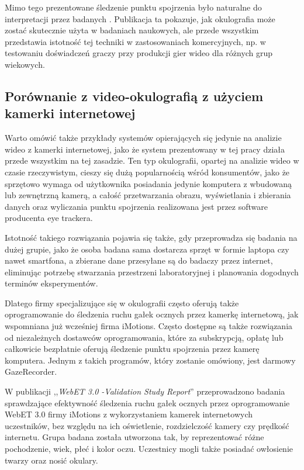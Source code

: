 \documentclass[a4paper,twoside,12pt]{book}
\newcommand{\obcy}[1]{\emph{#1}}
\newcommand{\english}[1]{{\selectlanguage{british}\obcy{#1}}}
\begin{document}
Mimo tego prezentowane śledzenie punktu spojrzenia było naturalne do interpretacji przez badanych \cite{bib:iMotions-children}. Publikacja ta pokazuje, jak okulografia może zostać skutecznie użyta w badaniach naukowych, ale przede wszystkim przedstawia istotność tej techniki w zastosowaniach komercyjnych, np. w testowaniu doświadczeń graczy przy produkcji gier wideo dla różnych grup wiekowych.

\subsection{Porównanie z video-okulografią z użyciem kamerki internetowej}
\label{subsec:porownanie-z-video-okulografia-z-uzyciem-kamerki-internetowej}

Warto omówić także przykłady systemów opierających się jedynie na analizie wideo z kamerki internetowej, jako że system prezentowany w tej pracy działa przede wszystkim na tej zasadzie. Ten typ okulografii, opartej na analizie wideo w czasie rzeczywistym, cieszy się dużą popularnością wśród konsumentów, jako że sprzętowo wymaga od użytkownika posiadania jedynie komputera z wbudowaną lub zewnętrzną kamerą, a całość przetwarzania obrazu, wyświetlania i zbierania danych oraz wyliczania punktu spojrzenia realizowana jest przez software producenta eye trackera.

Istotność takiego rozwiązania pojawia się także, gdy przeprowadza się badania na dużej grupie, jako że osoba badana sama dostarcza sprzęt w formie laptopa czy nawet smartfona, a zbierane dane przesyłane są do badaczy przez internet, eliminując potrzebę stwarzania przestrzeni laboratoryjnej i planowania dogodnych terminów eksperymentów.

Dlatego firmy specjalizujące się w okulografii często oferują także oprogramowanie do śledzenia ruchu gałek ocznych przez kamerkę internetową, jak wspomniana już wcześniej firma iMotions. Często dostępne są także rozwiązania od niezależnych dostawców oprogramowania, które za subskrypcją, opłatę lub całkowicie bezpłatnie oferują śledzenie punktu spojrzenia przez kamerę komputera. Jednym z takich programów, który zostanie omówiony, jest darmowy GazeRecorder.

W publikacji ,,\english{WebET 3.0 -Validation Study Report}'' przeprowadzono badania sprawdzające efektywność śledzenia ruchu gałek ocznych przez oprogramowanie WebET 3.0 firmy iMotions z wykorzystaniem kamerek internetowych uczestników, bez względu na ich oświetlenie, rozdzielczość kamery czy prędkość internetu. Grupa badana została utworzona tak, by reprezentować różne pochodzenie, wiek, płeć i kolor oczu. Uczestnicy mogli także posiadać owłosienie twarzy oraz nosić okulary.
\end{document}

